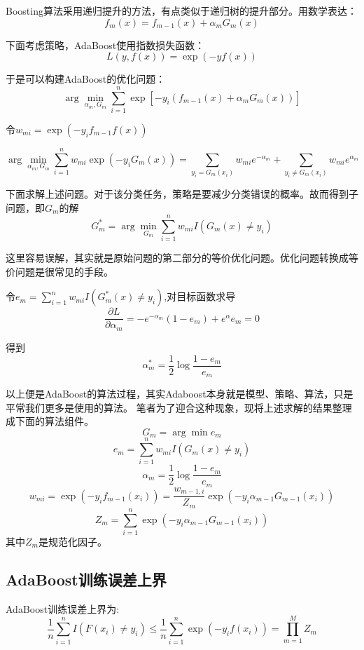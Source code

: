 \documentclass{article}
\begin{document}
            Boosting算法采用递归提升的方法，有点类似于递归树的提升部分。用数学表达：
            \[f_m(x)=f_{m-1}(x)+\alpha_mG_m(x)\]

            下面考虑策略，AdaBoost使用指数损失函数：
            \[L(y,f(x))=\exp(-yf(x))\]

            于是可以构建AdaBoost的优化问题：
            \[\arg\min_{\alpha_m,G_m}\sum_{i=1}^{n}\exp\left[-y_i(f_{m-1}(x)+\alpha_mG_m(x))\right]\]

            令$w_{mi}=\exp(-y_if_{m-1}f(x))$
            
            \[\arg\min_{\alpha_m,G_m}\sum_{i=1}^{n}w_{mi}\exp(-y_iG_m(x))=\sum_{y_i= G_m(x_i)}w_{mi}e^{-\alpha_m}+\sum_{y_i\neq G_m(x_i)}w_{mi}e^{\alpha_m}\]
            
            下面求解上述问题。对于该分类任务，策略是要减少分类错误的概率。故而得到子问题，即$G_m$的解
            \[G_m^*=\arg\min_{G_m}\sum_{i=1}^{n}w_{mi}I(G_m(x)\neq y_i)\]

            这里容易误解，其实就是原始问题的第二部分的等价优化问题。优化问题转换成等价问题是很常见的手段。

            令$e_m=\sum_{i=1}^{n}w_{mi}I(G_m^*(x)\neq y_i)$,对目标函数求导
            \[\frac{\partial L}{\partial \alpha_m}=-e^{-\alpha_m}(1-e_m)+e^\alpha e_m=0\]

            得到
            \[\alpha_m^*=\frac{1}{2}\log\frac{1-e_m}{e_m}\]

            以上便是AdaBoost的算法过程，其实Adaboost本身就是模型、策略、算法，只是平常我们更多是使用的算法。
            笔者为了迎合这种现象，现将上述求解的结果整理成下面的算法组件。
            \[G_m=\arg\min e_m\]
            \[e_m=\sum_{i=1}^{n}w_{mi}I(G_m(x)\neq y_i)\]
            \[\alpha_m=\frac{1}{2}\log\frac{1-e_m}{e_m}\]
            \[w_{mi}=\exp(-y_if_{m-1}(x_i))=\frac{w_{m-1,i}}{Z_m}\exp(-y_i\alpha_{m-1}G_{m-1}(x_i))\]
            \[Z_m=\sum_{i=1}^{n}\exp(-y_i\alpha_{m-1}G_{m-1}(x_i))\]
            其中$Z_m$是规范化因子。

        \subsection*{AdaBoost训练误差上界}
        AdaBoost训练误差上界为:
        \[\frac{1}{n}\sum_{i=1}^{n}I(F(x_i)\neq y_i)\le \frac{1}{n}\sum_{i=1}^{n}\exp(-y_if(x_i))=\prod_{m=1}^{M}Z_m \]
\end{document}
